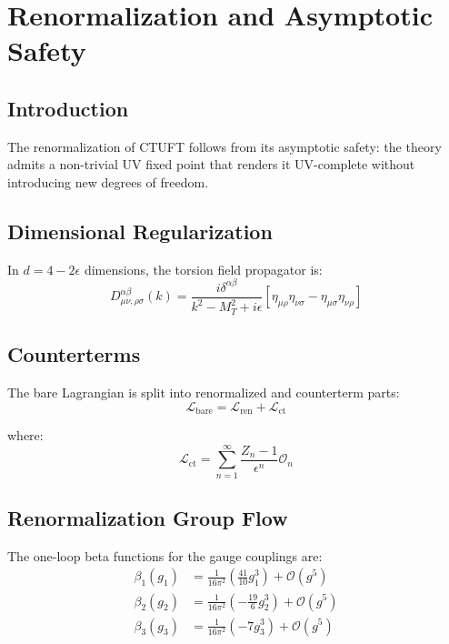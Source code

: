 \section{Renormalization and Asymptotic Safety}
\label{sec:renormalization}

\subsection{Introduction}

The renormalization of CTUFT follows from its asymptotic safety: the theory admits a non-trivial UV fixed point that renders it UV-complete without introducing new degrees of freedom.

\subsection{Dimensional Regularization}

In $d = 4 - 2\epsilon$ dimensions, the torsion field propagator is:
\begin{equation}
    D_{\mu\nu,\rho\sigma}^{\alpha\beta}(k) = \frac{i\delta^{\alpha\beta}}{k^2 - M_T^2 + i\epsilon} \left[\eta_{\mu\rho}\eta_{\nu\sigma} - \eta_{\mu\sigma}\eta_{\nu\rho}\right]
\end{equation}

\subsection{Counterterms}

The bare Lagrangian is split into renormalized and counterterm parts:
\begin{equation}
    \mathcal{L}_{\text{bare}} = \mathcal{L}_{\text{ren}} + \mathcal{L}_{\text{ct}}
\end{equation}

where:
\begin{equation}
    \mathcal{L}_{\text{ct}} = \sum_{n=1}^\infty \frac{Z_n - 1}{\epsilon^n} \mathcal{O}_n
\end{equation}

\subsection{Renormalization Group Flow}

\begin{theorem}
The one-loop beta functions for the gauge couplings are:
\begin{align}
    \beta_1(g_1) &= \frac{1}{16\pi^2} \left( \frac{41}{10} g_1^3 \right) + \mathcal{O}(g^5) \\
    \beta_2(g_2) &= \frac{1}{16\pi^2} \left( -\frac{19}{6} g_2^3 \right) + \mathcal{O}(g^5) \\
    \beta_3(g_3) &= \frac{1}{16\pi^2} \left( -7 g_3^3 \right) + \mathcal{O}(g^5)
\end{align}
\end{theorem}

